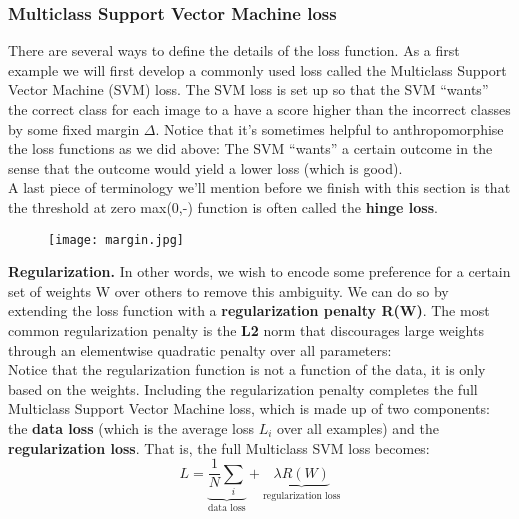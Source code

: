 \documentclass{report}
\begin{document}
	\subsubsection{Multiclass Support Vector Machine loss}

	There are several ways to define the details of the loss function. As a first example we will first develop a commonly used loss called the Multiclass Support Vector Machine (SVM) loss. The SVM loss is set up so that the SVM “wants” the correct class for each image to a have a score higher than the incorrect classes by some fixed margin $\Delta$. Notice that it’s sometimes helpful to anthropomorphise the loss functions as we did above: The SVM “wants” a certain outcome in the sense that the outcome would yield a lower loss (which is good). \\
	
	A last piece of terminology we’ll mention before we finish with this section is that the threshold at zero max(0,-) function is often called the \textbf{hinge loss}.
	
	\begin{figure}
		\texttt{[image: margin.jpg]}
	\end{figure}


	\textbf{Regularization.} In other words, we wish to encode some preference for a certain set of weights W over others to remove this ambiguity. We can do so by extending the loss function with a \textbf{regularization penalty R(W)}. The most common regularization penalty is the \textbf{L2} norm that discourages large weights through an elementwise quadratic penalty over all parameters:\\
	
	Notice that the regularization function is not a function of the data, it is only based on the weights. Including the regularization penalty completes the full Multiclass Support Vector Machine loss, which is made up of two components: the \textbf{data loss} (which is the average loss $L_i$ over all examples) and the \textbf{regularization loss}. That is, the full Multiclass SVM loss becomes:\\


	\begin{equation}
	L = \underbrace{\frac{1}{N}\sum_{i}^{}}_\text{data loss} + \underbrace{\lambda R(W)}_\text{regularization loss}
	\end{equation}














	
\end{document}
